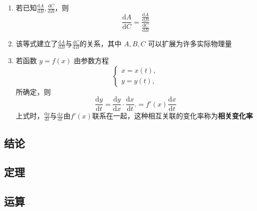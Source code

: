 \documentclass[a4paper,12pt]{article}
\begin{document}
    \begin{enumerate}
        \item 若已知$\displaystyle\frac{\mathrm{d}A}{\mathrm{d}B}, \displaystyle\frac{\mathrm{d}C}{\mathrm{d}B}$，则
        \[
            \frac{\mathrm{d}A}{\mathrm{d}C} = \frac{\displaystyle\frac{\mathrm{d}A}{\mathrm{d}B}}{\displaystyle\frac{\mathrm{d}C}{\mathrm{d}B}}
        \]
        \item 该等式建立了$\displaystyle\frac{\mathrm{d}A}{\mathrm{d}B}$与$\displaystyle\frac{\mathrm{d}C}{\mathrm{d}B}$的关系，其中 $A,B,C$ 可以扩展为许多实际物理量
        \item 若函数 $y=f(x)$ 由参数方程
        \[
            \begin{cases}
                x = x(t), \\
                y = y(t),
            \end{cases}
        \]
        所确定，则
        \[
            \frac{\mathrm{d}y}{\mathrm{d}t}
            = \frac{\mathrm{d}y}{\mathrm{d}x}\cdot \frac{\mathrm{d}x}{\mathrm{d}t}.
            = f'(x)\frac{\mathrm{d}x}{\mathrm{d}t}
        \]
        上式时，$\displaystyle\frac{\mathrm{d}y}{\mathrm{d}t}$与$\displaystyle\frac{\mathrm{d}x}{\mathrm{d}t}$由$f'(x)$联系在一起，这种相互关联的变化率称为\textbf{相关变化率}
    \end{enumerate}

    \subsection{结论}

    \begin{enumerate}
    \end{enumerate}

    \subsection{定理}

    \begin{enumerate}
    \end{enumerate}

    \subsection{运算}

    \begin{enumerate}

    \end{enumerate}
\end{document}
